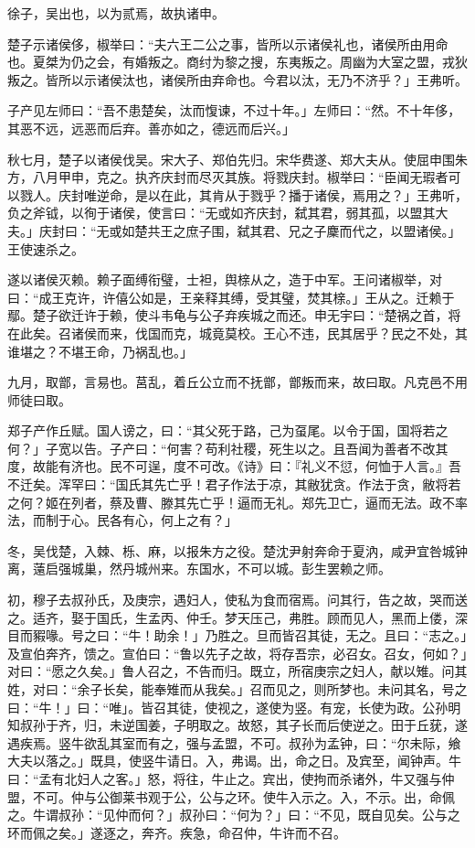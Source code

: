 \documentclass[]{article}
\begin{document}
徐子，吴出也，以为贰焉，故执诸申。

楚子示诸侯侈，椒举曰：``夫六王二公之事，皆所以示诸侯礼也，诸侯所由用命也。夏桀为仍之会，有婚叛之。商纣为黎之搜，东夷叛之。周幽为大室之盟，戎狄叛之。皆所以示诸侯汰也，诸侯所由弃命也。今君以汰，无乃不济乎？」王弗听。

子产见左师曰：``吾不患楚矣，汰而愎谏，不过十年。」左师曰：``然。不十年侈，其恶不远，远恶而后弃。善亦如之，德远而后兴。」

秋七月，楚子以诸侯伐吴。宋大子、郑伯先归。宋华费遂、郑大夫从。使屈申围朱方，八月甲申，克之。执齐庆封而尽灭其族。将戮庆封。椒举曰：``臣闻无瑕者可以戮人。庆封唯逆命，是以在此，其肯从于戮乎？播于诸侯，焉用之？」王弗听，负之斧钺，以徇于诸侯，使言曰：``无或如齐庆封，弑其君，弱其孤，以盟其大夫。」庆封曰：``无或如楚共王之庶子围，弑其君、兄之子麇而代之，以盟诸侯。」王使速杀之。

遂以诸侯灭赖。赖子面缚衔璧，士袒，舆榇从之，造于中军。王问诸椒举，对曰：``成王克许，许僖公如是，王亲释其缚，受其璧，焚其榇。」王从之。迁赖于鄢。楚子欲迁许于赖，使斗韦龟与公子弃疾城之而还。申无宇曰：``楚祸之首，将在此矣。召诸侯而来，伐国而克，城竟莫校。王心不违，民其居乎？民之不处，其谁堪之？不堪王命，乃祸乱也。」

九月，取鄫，言易也。莒乱，着丘公立而不抚鄫，鄫叛而来，故曰取。凡克邑不用师徒曰取。

郑子产作丘赋。国人谤之，曰：``其父死于路，己为虿尾。以令于国，国将若之何？」子宽以告。子产曰：``何害？苟利社稷，死生以之。且吾闻为善者不改其度，故能有济也。民不可逞，度不可改。《诗》曰：『礼义不愆，何恤于人言。』吾不迁矣。浑罕曰：``国氏其先亡乎！君子作法于凉，其敝犹贪。作法于贪，敝将若之何？姬在列者，蔡及曹、滕其先亡乎！逼而无礼。郑先卫亡，逼而无法。政不率法，而制于心。民各有心，何上之有？」

冬，吴伐楚，入棘、栎、麻，以报朱方之役。楚沈尹射奔命于夏汭，咸尹宜咎城钟离，薳启强城巢，然丹城州来。东国水，不可以城。彭生罢赖之师。

初，穆子去叔孙氏，及庚宗，遇妇人，使私为食而宿焉。问其行，告之故，哭而送之。适齐，娶于国氏，生孟丙、仲壬。梦天压己，弗胜。顾而见人，黑而上偻，深目而豭喙。号之曰：``牛！助余！」乃胜之。旦而皆召其徒，无之。且曰：``志之。」及宣伯奔齐，馈之。宣伯曰：``鲁以先子之故，将存吾宗，必召女。召女，何如？」对曰：``愿之久矣。」鲁人召之，不告而归。既立，所宿庚宗之妇人，献以雉。问其姓，对曰：``余子长矣，能奉雉而从我矣。」召而见之，则所梦也。未问其名，号之曰：``牛！」曰：``唯」。皆召其徒，使视之，遂使为竖。有宠，长使为政。公孙明知叔孙于齐，归，未逆国姜，子明取之。故怒，其子长而后使逆之。田于丘莸，遂遇疾焉。竖牛欲乱其室而有之，强与孟盟，不可。叔孙为孟钟，曰：``尔未际，飨大夫以落之。」既具，使竖牛请日。入，弗谒。出，命之日。及宾至，闻钟声。牛曰：``孟有北妇人之客。」怒，将往，牛止之。宾出，使拘而杀诸外，牛又强与仲盟，不可。仲与公御莱书观于公，公与之环。使牛入示之。入，不示。出，命佩之。牛谓叔孙：``见仲而何？」叔孙曰：``何为？」曰：``不见，既自见矣。公与之环而佩之矣。」遂逐之，奔齐。疾急，命召仲，牛许而不召。
\end{document}
